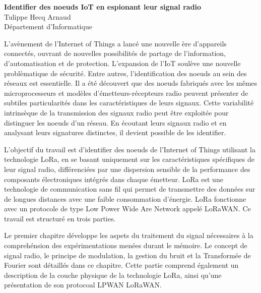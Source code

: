 \documentclass[a4paper,11pt]{article}
\begin{document}
\begin{center}
    \LARGE \textbf{Identifier des noeuds IoT en espionant leur signal radio} \\
    \vspace{0.2cm}
    \large Tulippe Hecq Arnaud \\
    \normalsize Département d'Informatique \\
    \vspace{0.5cm}
\end{center}


\noindent L'avènement de l'Internet of Things a lancé une nouvelle ère d'appareils connectés, ouvrant de nouvelles possibilités de partage de l'information, d'automatisation et de protection. L'expansion de l'IoT soulève une nouvelle problèmatique de sécurité. Entre autres, l'identification des noeuds au sein des réseaux est essentielle. Il a été découvert que des noeuds fabriqués avec les mêmes microprocesseurs et modèles d'émetteurs-récepteurs radio peuvent présenter de subtiles particularités dans les caractéristiques de leurs signaux. Cette variabilité intrinsèque de la transmission des signaux radio peut être exploitée pour distinguer les noeuds d’un réseau. En écoutant leurs signaux radio et en analysant leurs signatures distinctes, il devient possible de les identifier.

\vspace{0.2cm}
\noindent L'objectif du travail est d'identifier des noeuds de l'Internet of Things utilisant la technologie LoRa, en se basant uniquement sur les caractéristiques spécifiques de leur signal radio, différenciées par une dispersion sensible de la performance des composants électroniques intégrés dans chaque émetteur. LoRa est une technologie de communication sans fil qui permet de transmettre des données sur de longues distances avec une faible consommation d'énergie. LoRa fonctionne avec un protocole de type Low Power Wide Are Network appelé LoRaWAN. Ce travail est structuré en trois parties.

\vspace{0.2cm}

\noindent Le premier chapitre développe les aspets du traitement du signal nécessaires à la comprehénsion des expérimentations menées durant le mémoire. Le concept de signal radio, le principe de modulation, la gestion du bruit et la Transformée de Fourier sont détaillés dans ce chapitre. Cette partie comprend également un description de la couche physique de la technologie LoRa, ainsi qu'une présentation de son protocoal LPWAN LoRaWAN.
\end{document}
